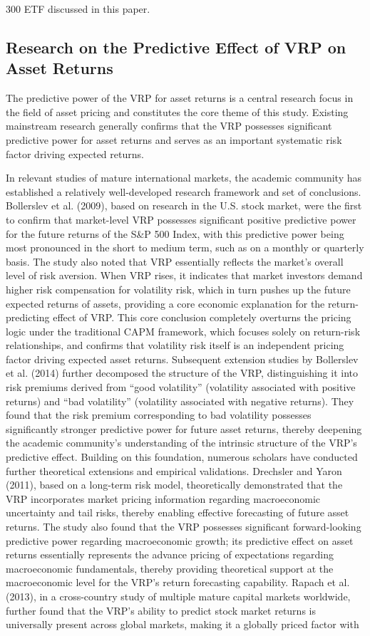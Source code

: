 \documentclass[a4paper, 12pt]{article}    %
\begin{document}
300 ETF discussed in this paper.

\subsection{Research on the Predictive Effect of VRP on Asset Returns}
The predictive power of the VRP for asset returns is a central research focus in the field of asset pricing and constitutes the core theme of this study. Existing mainstream research generally confirms that the VRP possesses significant predictive power for asset returns and serves as an important systematic risk factor driving expected returns.

In relevant studies of mature international markets, the academic community has established a relatively well-developed research framework and set of conclusions. Bollerslev et al. (2009), based on research in the U.S. stock market, were the first to confirm that market-level VRP possesses significant positive predictive power for the future returns of the S&P 500 Index, with this predictive power being most pronounced in the short to medium term, such as on a monthly or quarterly basis. The study also noted that VRP essentially reflects the market’s overall level of risk aversion. When VRP rises, it indicates that market investors demand higher risk compensation for volatility risk, which in turn pushes up the future expected returns of assets, providing a core economic explanation for the return-predicting effect of VRP. This core conclusion completely overturns the pricing logic under the traditional CAPM framework, which focuses solely on return-risk relationships, and confirms that volatility risk itself is an independent pricing factor driving expected asset returns. Subsequent extension studies by Bollerslev et al. (2014) further decomposed the structure of the VRP, distinguishing it into risk premiums derived from “good volatility” (volatility associated with positive returns) and “bad volatility” (volatility associated with negative returns). They found that the risk premium corresponding to bad volatility possesses significantly stronger predictive power for future asset returns, thereby deepening the academic community’s understanding of the intrinsic structure of the VRP’s predictive effect. Building on this foundation, numerous scholars have conducted further theoretical extensions and empirical validations. Drechsler and Yaron (2011), based on a long-term risk model, theoretically demonstrated that the VRP incorporates market pricing information regarding macroeconomic uncertainty and tail risks, thereby enabling effective forecasting of future asset returns. The study also found that the VRP possesses significant forward-looking predictive power regarding macroeconomic growth; its predictive effect on asset returns essentially represents the advance pricing of expectations regarding macroeconomic fundamentals, thereby providing theoretical support at the macroeconomic level for the VRP’s return forecasting capability. Rapach et al. (2013), in a cross-country study of multiple mature capital markets worldwide, further found that the VRP’s ability to predict stock market returns is universally present across global markets, making it a globally priced factor with 
\end{document}
